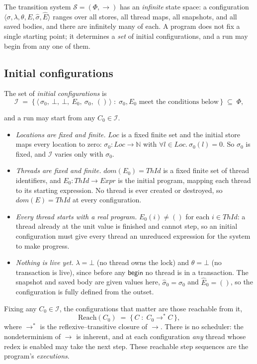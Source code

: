\documentclass[manuscript,nonacm]{acmart}
\theoremstyle{acmdefinition}
\newcommand{\Loc}{\mathit{Loc}}
\newcommand{\ThId}{\mathit{ThId}}   %
\newcommand{\Expr}{\mathit{Expr}}
\newcommand{\unit}{()}
\newcommand{\bbegin}{\textsf{begin}}
\begin{document}
The transition system $\mathcal{S}=(\Phi,\rightarrow)$ has an \emph{infinite}
state space: a configuration $\langle\sigma,\lambda,\theta,E,\hat{\sigma},\hat{E}\rangle$
ranges over all stores, all thread maps, all snapshots, and all saved bodies, and
there are infinitely many of each. A program does not fix a single starting point;
it determines a \emph{set} of initial configurations, and a run may begin from any
one of them.

\subsection{Initial configurations}

The set of \emph{initial configurations} is
\[
\mathcal{I} \;=\;
\bigl\{\, \langle\, \sigma_0,\ \bot,\ \bot,\ E_0,\ \sigma_0,\ \unit \,\rangle
\;:\; \sigma_0, E_0 \text{ meet the conditions below} \,\bigr\}
\;\subseteq\; \Phi ,
\]

and a run may start from any $C_0 \in \mathcal{I}$.
\begin{itemize}
\item \emph{Locations are fixed and finite.} $\Loc$ is a fixed finite set and the
initial store maps every location to zero: $\sigma_0 : \Loc \rightarrow \mathbb{N}$
with $\forall l \in \Loc.\ \sigma_0(l) = 0$. So $\sigma_0$ is fixed, and
$\mathcal{I}$ varies only with  $\sigma_{0}$.
\item \emph{Threads are fixed and finite.} $dom(E_0) = \ThId$ is a fixed finite set
of thread identifiers, and $E_0 : \ThId \rightarrow \Expr$ is the initial program,
mapping each thread to its starting expression. No thread is ever created or
destroyed, so $dom(E) = \ThId$ at every configuration.
\item \emph{Every thread starts with a real program.} $E_0(i) \neq \unit$ for each
$i \in \ThId$: a thread already at the unit value is finished and cannot step, so an
initial configuration must give every thread an unreduced expression for the system
to make progress.
\item \emph{Nothing is live yet.} $\lambda = \bot$ (no thread owns the lock) and
$\theta = \bot$ (no transaction is live), since before any $\bbegin$ no thread is in
a transaction. The snapshot and saved body are given values here,
$\hat{\sigma}_0 = \sigma_0$ and $\hat{E}_0 = \unit$, so the configuration is fully
defined from the outset.
\end{itemize}

Fixing any $C_0 \in \mathcal{I}$, the configurations that matter are those
reachable from it,
\[
\mathrm{Reach}(C_0) \;=\; \{\, C \;:\; C_0 \rightarrow^{*} C \,\},
\]
where $\rightarrow^{*}$ is the reflexive--transitive closure of $\rightarrow$.
There is no scheduler: the nondeterminism of $\rightarrow$ is inherent, and at each
configuration \emph{any} thread whose redex is enabled may take the next step.
These reachable step sequences are the program's \emph{executions}.
\end{document}
